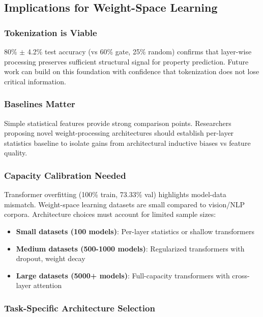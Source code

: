 \subsection{Implications for Weight-Space Learning}

\subsubsection{Tokenization is Viable}

80\% $\pm$ 4.2\% test accuracy (vs 60\% gate, 25\% random) confirms that layer-wise processing preserves sufficient structural signal for property prediction. Future work can build on this foundation with confidence that tokenization does not lose critical information.

\subsubsection{Baselines Matter}

Simple statistical features provide strong comparison points. Researchers proposing novel weight-processing architectures should establish per-layer statistics baseline to isolate gains from architectural inductive biases vs feature quality.

\subsubsection{Capacity Calibration Needed}

Transformer overfitting (100\% train, 73.33\% val) highlights model-data mismatch. Weight-space learning datasets are small compared to vision/NLP corpora. Architecture choices must account for limited sample sizes:

\begin{itemize}
\item \textbf{Small datasets (100 models)}: Per-layer statistics or shallow transformers
\item \textbf{Medium datasets (500-1000 models)}: Regularized transformers with dropout, weight decay
\item \textbf{Large datasets (5000+ models)}: Full-capacity transformers with cross-layer attention
\end{itemize}

\subsubsection{Task-Specific Architecture Selection}

